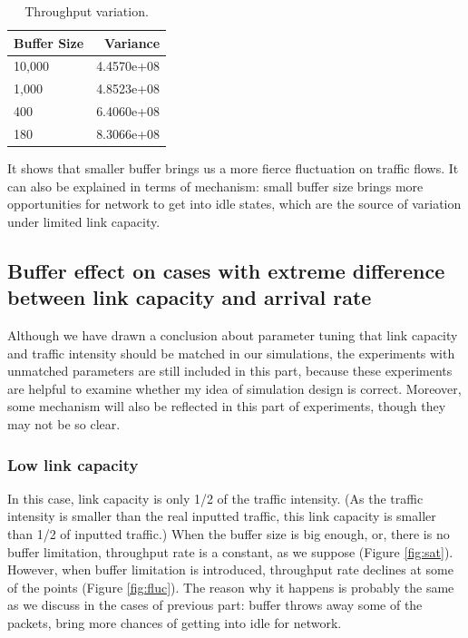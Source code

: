 \documentclass[a4paper]{article}
\begin{document}
\begin{table}
\centering
\begin{tabular}{l|r}
Buffer Size & Variance \\\hline
10,000 & 4.4570e+08 \\
1,000 & 4.8523e+08 \\
400 & 6.4060e+08\\
180 & 8.3066e+08
\end{tabular}
\caption{\label{tab:throughputVar}Throughput variation.}
\end{table}

	
It shows that smaller buffer brings us a more fierce fluctuation on traffic flows. It can also be explained in terms of mechanism: small buffer size brings more opportunities for network to get into idle states, which are the source of variation under limited link capacity.

\subsection{Buffer effect on cases with extreme difference between link capacity and arrival rate}
Although we have drawn a conclusion about parameter tuning that link capacity and traffic intensity should be matched in our simulations, the experiments with unmatched parameters are still included in this part, because these experiments are helpful to examine whether my idea of simulation design is correct. Moreover, some mechanism will also be reflected in this part of experiments, though they may not be so clear.

\subsubsection{Low link capacity}

In this case, link capacity is only 1/2 of the traffic intensity. (As the traffic intensity is smaller than the real inputted traffic, this link capacity is smaller than 1/2 of inputted traffic.) When the buffer size is big enough, or, there is no buffer limitation, throughput rate is a constant, as we suppose (Figure \ref{fig:sat}). However, when buffer limitation is introduced, throughput rate declines at some of the points (Figure \ref{fig:fluc}). The reason why it happens is probably the same as we discuss in the cases of previous part: buffer throws away some of the packets, bring more chances of getting into idle for network.
\end{document}
